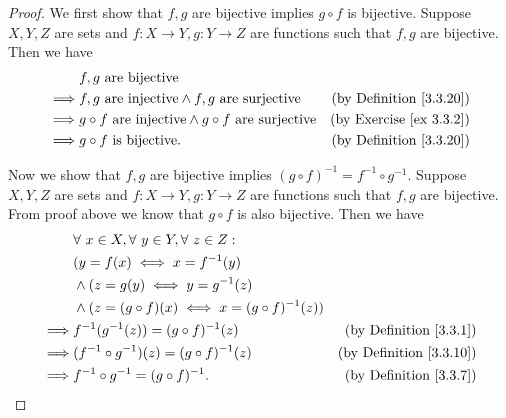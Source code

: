 \begin{proof}
We first show that \(f, g\) are bijective implies \(g \circ f\) is bijective.
Suppose \(X, Y, Z\) are sets and \(f : X \to Y, g : Y \to Z\) are functions such that \(f, g\) are bijective.
Then we have
\begin{align*}
& f, g \text{ are bijective} \\
\implies & f, g \text{ are injective} \land f, g \text{ are surjective} & \text{(by Definition \ref{3.3.20})} \\
\implies & g \circ f \text{ are injective} \land g \circ f \text{ are surjective} & \text{(by Exercise \ref{ex 3.3.2})} \\
\implies & g \circ f \text{ is bijective}. & \text{(by Definition \ref{3.3.20})}
\end{align*}

Now we show that \(f, g\) are bijective implies \((g \circ f)^{-1} = f^{-1} \circ g^{-1}\).
Suppose \(X, Y, Z\) are sets and \(f : X \to Y, g : Y \to Z\) are functions such that \(f, g\) are bijective.
From proof above we know that \(g \circ f\) is also bijective.
Then we have
\begin{align*}
& \forall\ x \in X, \forall\ y \in Y, \forall\ z \in Z : \\
& (y = f(x) \iff x = f^{-1}(y) \\
& \land (z = g(y) \iff y = g^{-1}(z) \\
& \land (z = (g \circ f)(x) \iff x = (g \circ f)^{-1}(z)) \\
\implies & f^{-1}(g^{-1}(z)) = (g \circ f)^{-1}(z) & \text{(by Definition \ref{3.3.1})} \\
\implies & (f^{-1} \circ g^{-1})(z) = (g \circ f)^{-1}(z) & \text{(by Definition \ref{3.3.10})} \\
\implies & f^{-1} \circ g^{-1} = (g \circ f)^{-1}. & \text{(by Definition \ref{3.3.7})}
\end{align*}
\end{proof}

